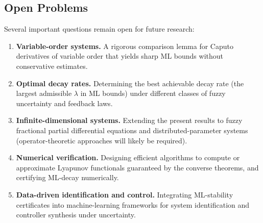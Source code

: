 \documentclass[11pt,a4paper]{article}
\theoremstyle{plain}
\theoremstyle{definition}
\theoremstyle{remark}
\begin{document}
	\subsection*{Open Problems}
	Several important questions remain open for future research:
	\begin{enumerate}
		\item \textbf{Variable-order systems.} A rigorous comparison lemma for Caputo derivatives of variable order that yields sharp ML bounds without conservative estimates.
		\item \textbf{Optimal decay rates.} Determining the best achievable decay rate (the largest admissible $\lambda$ in ML bounds) under different classes of fuzzy uncertainty and feedback laws.
		\item \textbf{Infinite-dimensional systems.} Extending the present results to fuzzy fractional partial differential equations and distributed-parameter systems (operator-theoretic approaches will likely be required).
		\item \textbf{Numerical verification.} Designing efficient algorithms to compute or approximate Lyapunov functionals guaranteed by the converse theorems, and certifying ML-decay numerically.
		\item \textbf{Data-driven identification and control.} Integrating ML-stability certificates into machine-learning frameworks for system identification and controller synthesis under uncertainty.
	\end{enumerate}
\end{document}
